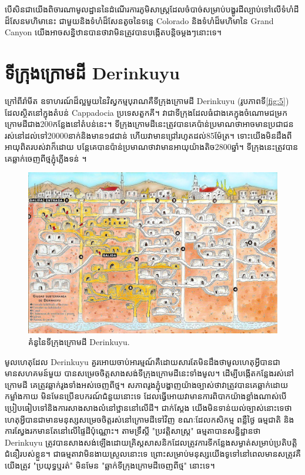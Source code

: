 \documentclass[10pt,twocolumn,letterpaper]{article}
\begin{document}
បើសិនជាយើងពិចារណាមូលដ្ឋាននៃដំណើរការភូមិសាស្ត្រដែលចំបាច់សម្រាប់បង្ហូរដីល្បាប់ទៅលើទំហំដីដ៏សែនមហិមានេះ ជាមួយនិងទំហំដ៏សែនតូចនៃទន្លេ Colorado និងទំហំដ៏មហិមានៃ Grand Canyon យើងអាចសន្និឋានបានថាវាមិនត្រូវបានបង្កើតបន្តិចម្តងៗនោះទេ។

\section{ទីក្រុងក្រោមដី Derinkuyu}

ក្រៅពីរ៉ាមីត ឧទាហរណ៍ដ៏ល្អមួយនៃវិស្វកម្មបុរាណគឺទីក្រុងក្រោមដី Derinkuyu (រូបភាពទី\ref{fig:5}) ដែលស្ថិតនៅក្នុងតំបន់ Cappadocia ប្រទេសតួកគី។ វាជាទីក្រុងដែលធំជាងគេក្នុងចំណោមជម្រកក្រោមដីជាង200កន្លែងនៅតំបន់នេះ\cite{54}។ ទីក្រុងក្រោមដីនេះត្រូវបានគេប៉ាន់ប្រមាណថាអាចមានប្រជាជនរស់នៅដល់ទៅ20000នាក់និងមាន១៨ជាន់ ហើយវាមានជ្រៅរហូតដល់85ម៉ែត្រ។ ទោះយើងមិនដឹងពីអាយុពិតរបស់វាក៏ដោយ បន្តែគេបានប៉ាន់ប្រមាណថាវាមានអាយុយ៉ាងតិច2800ឆ្នាំ។ ទីក្រុងនេះត្រូវបានគេឆ្លាក់ចេញពីថ្មភ្នុំភ្លើងទន់ \cite{52, 53}។

\begin{figure}[b]
\begin{center}

   \includegraphics[width=1\linewidth]{derinkuyu.jpeg}
\end{center}
   \caption{គំនូនៃទីក្រុងក្រោមដី Derinkuyu\cite{56}.}
\label{fig:5}
\label{fig:onecol}
\end{figure}

មូលហេតុដែល Derinkuyu គួរអោយចាប់អារម្មណ៍គឺដោយសារតែមិនដឹងថាមូលហេតុអ្វីបានជាមានសហគមន៍មួយ បានសម្រេចចិត្តសាងសង់ទីក្រុងក្រោមដីនេះទាំងមូល។ ដើម្បីបង្កើតកន្លែងរស់នៅក្រោមដី គេត្រូវឆ្លាក់រូងទាំងអស់ចេញពីថ្ម។ សភាពរូងភ្នុំបង្ហាញយ៉ាងច្បាស់ថាវាត្រូវបានគេឆ្លាក់ដោយកម្លាំងកាយ មិនមែនប្រើឧបករណ៍ជំនួយនោះទេ ដែលធ្វើអោយវាមានការពិបាកយ៉ាងខ្លាំងណាស់បើប្រៀបធៀបទៅនិងការសាងសាងលំនៅឋ្ឋាននៅលើដី។ ជាក់ស្តែង យើងមិនទាន់យល់ច្បាស់នោះទេថាហេតុអ្វីបានជាមានមនុស្សសម្រេចចិត្តរស់នៅក្រោមដីទៅវិញ ខណៈដែលកសិកម្ម ពន្លឺថ្ងៃ ធម្មជាតិ និងការស្វែងរកមានតែនៅលើផ្ទៃដីប៉ុណ្ណោះ។ តាមទ្រឹស្តី "ប្រវត្តិសាស្រ្ត" ធម្មតាបានសន្និដ្ឋានថា Derinkuyu ត្រូវបានសាងសង់ឡើងដោយគ្រិស្ដសាសនិកដែលត្រូវការទីកន្លែងសម្ងាត់សម្រាប់ប្រតិបត្តិជំនឿរបស់ខ្លួន\cite{53}។ ជាធម្មតាវាមិនងាយស្រួលនោះទេ ព្រោះសម្រាប់មនុស្សយើងទូទៅនៅពេលមានសត្រូវគឺយើងត្រូវ "ប្រយុទ្ធឬរត់" មិនមែន "ឆ្លាក់ទីក្រុងក្រោមដីចេញពីថ្ម" នោះទេ។
\end{document}
